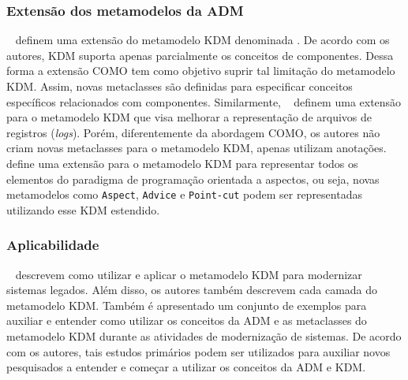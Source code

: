 \subsubsection{Extensão dos metamodelos da ADM} %
\label{ssub:extension_of_adm_s_metamodels}

~ definem uma extensão do metamodelo KDM denominada . De acordo com os autores, KDM suporta apenas parcialmente os conceitos de componentes. Dessa forma a extensão COMO tem como objetivo suprir tal limitação do metamodelo KDM. Assim, novas metaclasses são definidas para especificar conceitos específicos relacionados com componentes. Similarmente, ~ definem uma extensão para o metamodelo KDM que visa melhorar a representação de arquivos de registros (\textit{logs}). Porém, diferentemente da abordagem COMO, os autores não criam novas metaclasses para o metamodelo KDM, apenas utilizam anotações. ~ define uma extensão para o metamodelo KDM para representar todos os elementos do paradigma de programação orientada a aspectos, ou seja, novas metamodelos como \texttt{Aspect}, \texttt{Advice} e \texttt{Point-cut} podem ser representadas utilizando esse KDM estendido.


\subsubsection{Aplicabilidade} %
\label{ssub:applicability}


~ descrevem como utilizar e aplicar  o metamodelo KDM para modernizar sistemas legados. Além disso, os autores também descrevem cada camada do metamodelo KDM. Também é apresentado um conjunto de exemplos para auxiliar e entender como utilizar os conceitos da ADM e as metaclasses do metamodelo KDM durante as atividades de modernização de sistemas. De acordo com os autores, tais estudos primários podem ser utilizados para auxiliar novos pesquisados a entender e começar a utilizar os conceitos da ADM e KDM.


